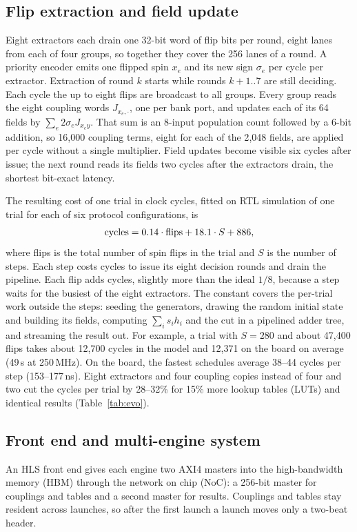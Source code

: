 \subsection{Flip extraction and field update}\label{subsec:update}
Eight extractors each drain one 32-bit word of flip bits per round, eight lanes from each of four groups, so together they cover the 256 lanes of a round. A priority encoder emits one flipped spin $x_e$ and its new sign $\sigma_e$ per cycle per extractor. Extraction of round $k$ starts while rounds $k{+}1..7$ are still deciding. Each cycle the up to eight flips are broadcast to all groups. Every group reads the eight coupling words $J_{x_e,\cdot}$, one per bank port, and updates each of its 64 fields by $\sum_e 2\sigma_eJ_{x_e y}$. That sum is an 8-input population count followed by a 6-bit addition, so 16{,}000 coupling terms, eight for each of the 2{,}048 fields, are applied per cycle without a single multiplier. Field updates become visible six cycles after issue; the next round reads its fields two cycles after the extractors drain, the shortest bit-exact latency.

The resulting cost of one trial in clock cycles, fitted on RTL simulation of one trial for each of six protocol configurations, is
\begin{equation}
  \text{cycles}=0.14\cdot\text{flips}+18.1\cdot S+886 ,
  \label{eq:cycles}
\end{equation}
where flips is the total number of spin flips in the trial and $S$ is the number of steps. Each step costs \cycStep{} cycles to issue its eight decision rounds and drain the pipeline. Each flip adds \cycFlip{} cycles, slightly more than the ideal $1/8$, because a step waits for the busiest of the eight extractors. The constant covers the per-trial work outside the steps: seeding the generators, drawing the random initial state and building its fields, computing $\sum_is_ih_i$ and the cut in a pipelined adder tree, and streaming the result out. For example, a trial with $S=280$ and about 47{,}400 flips takes about 12{,}700 cycles in the model and 12{,}371 on the board on average (49\,\textmu s at 250\,MHz).
On the board, the fastest schedules average 38--44 cycles per step (153--177\,ns). Eight extractors and four coupling copies instead of four and two cut the cycles per trial by 28--32\% for 15\% more lookup tables (LUTs) and identical results (Table~\ref{tab:evo}).

\subsection{Front end and multi-engine system}\label{subsec:system}
An HLS front end gives each engine two AXI4 masters into the high-bandwidth memory (HBM) through the network on chip (NoC): a 256-bit master for couplings and tables and a second master for results. Couplings and tables stay resident across launches, so after the first launch a launch moves only a two-beat header.

